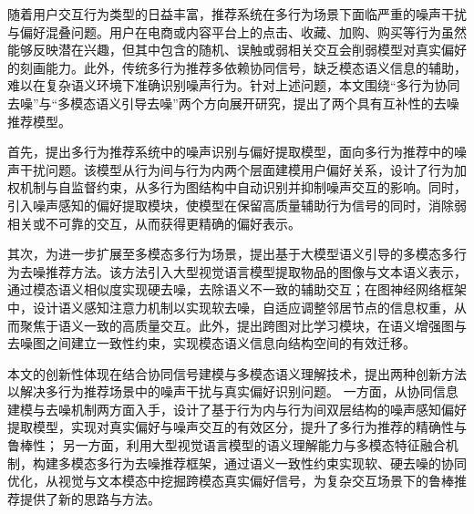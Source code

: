 \begin{cabstract}

随着用户交互行为类型的日益丰富，推荐系统在多行为场景下面临严重的噪声干扰与偏好混叠问题。用户在电商或内容平台上的点击、收藏、加购、购买等行为虽然能够反映潜在兴趣，但其中包含的随机、误触或弱相关交互会削弱模型对真实偏好的刻画能力。此外，传统多行为推荐多依赖协同信号，缺乏模态语义信息的辅助，难以在复杂语义环境下准确识别噪声行为。针对上述问题，本文围绕“多行为协同去噪”与“多模态语义引导去噪”两个方向展开研究，提出了两个具有互补性的去噪推荐模型。

首先，提出多行为推荐系统中的噪声识别与偏好提取模型，面向多行为推荐中的噪声干扰问题。该模型从行为间与行为内两个层面建模用户偏好关系，设计了行为加权机制与自监督约束，从多行为图结构中自动识别并抑制噪声交互的影响。同时，引入噪声感知的偏好提取模块，使模型在保留高质量辅助行为信号的同时，消除弱相关或不可靠的交互，从而获得更精确的偏好表示。

其次，为进一步扩展至多模态多行为场景，提出基于大模型语义引导的多模态多行为去噪推荐方法。该方法引入大型视觉语言模型提取物品的图像与文本语义表示，通过模态语义相似度实现硬去噪，去除语义不一致的辅助交互；在图神经网络框架中，设计语义感知注意力机制以实现软去噪，自适应调整邻居节点的信息权重，从而聚焦于语义一致的高质量交互。此外，提出跨图对比学习模块，在语义增强图与去噪图之间建立一致性约束，实现模态语义信息向结构空间的有效迁移。

本文的创新性体现在结合协同信号建模与多模态语义理解技术，提出两种创新方法以解决多行为推荐场景中的噪声干扰与真实偏好识别问题。
一方面，从协同信息建模与去噪机制两方面入手，设计了基于行为内与行为间双层结构的噪声感知偏好提取模型，实现对真实偏好与噪声交互的有效区分，提升了多行为推荐的精确性与鲁棒性；
另一方面，利用大型视觉语言模型的语义理解能力与多模态特征融合机制，构建多模态多行为去噪推荐框架，通过语义一致性约束实现软、硬去噪的协同优化，从视觉与文本模态中挖掘跨模态真实偏好信号，为复杂交互场景下的鲁棒推荐提供了新的思路与方法。


\end{cabstract}

